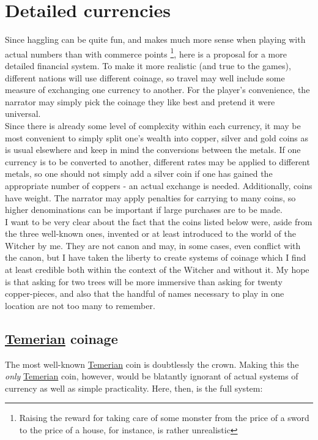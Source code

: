 \documentclass[parskip=full,11pt,%
footheight=38pt]{scrreport}
\begin{document}
\chapter{Detailed currencies}
Since haggling can be quite fun, and makes much more sense when playing with actual numbers than with commerce points%
\footnote{Raising the reward for taking care of some monster from the price of a sword to the price of a house, for instance,
	is rather unrealistic},
here is a proposal for a more detailed financial system. To make it more realistic (and true to the games), different nations
will use different coinage, so travel may well include some measure of exchanging one currency to another. For the player's
convenience, the narrator may simply pick the coinage they like best and pretend it were universal.
\\[2ex]
Since there is already some level of complexity within each currency, it may be most convenient to simply split one's
wealth into copper, silver and gold coins as is usual elsewhere and keep in mind the conversions between the metals.
If one currency is to be converted to another, different rates may be applied to different metals, so one should not simply
add a silver coin if one has gained the appropriate number of coppers - an actual exchange is needed. Additionally,
coins have weight. The narrator may apply penalties for carrying to many coins, so higher denominations can be important
if large purchases are to be made.
\\[2ex]
I want to be very clear about the fact that the coins listed below were, aside from the three well-known ones, invented
or at least introduced to the world of the Witcher by me. They are not canon and may, in some cases, even conflict
with the canon, but I have taken the liberty to create systems of coinage which I find at least credible both within
the context of the Witcher and without it. My hope is that asking for two trees will be more immersive than asking
for twenty copper-pieces, and also that the handful of names necessary to play in one location are not too many to
remember.

\section{\hyperref[realm:temeria]{Temerian} coinage}
The most well-known \hyperref[realm:temeria]{Temerian} coin is doubtlessly the crown. Making this the \textit{only}
\hyperref[realm:temeria]{Temerian} coin, however, would be blatantly ignorant of actual systems of currency as well
as simple practicality. Here, then, is the full system:
\end{document}
